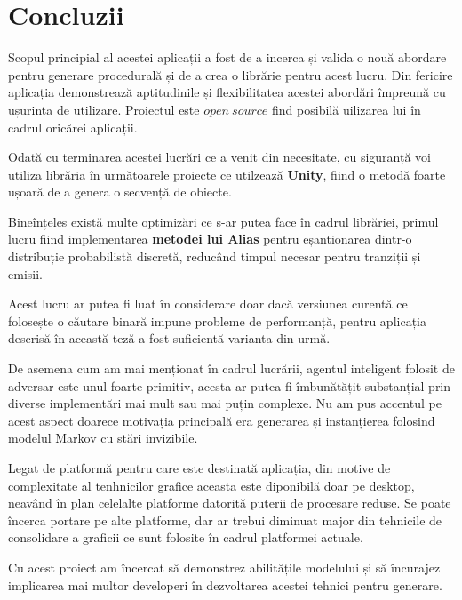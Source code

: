 \chapter*{Concluzii} 

Scopul principial al acestei aplicații a fost de a incerca și valida o nouă abordare pentru generare procedurală și de a crea o librărie pentru acest lucru. Din fericire aplicația demonstrează aptitudinile și flexibilitatea acestei abordări împreună cu ușurința de utilizare. Proiectul este $open \ source$ find posibilă uilizarea lui în cadrul oricărei aplicații.\par

Odată cu terminarea acestei lucrări ce a venit din necesitate, cu siguranță voi utiliza librăria în următoarele proiecte ce utilzează \textbf{Unity}, fiind o metodă foarte ușoară de a genera o secvență de obiecte.\par

Bineînțeles există multe optimizări ce s-ar putea face în cadrul librăriei, primul lucru fiind implementarea \textbf{metodei lui Alias} pentru eșantionarea dintr-o distribuție probabilistă discretă, reducând timpul necesar pentru tranziții și emisii.\par 

Acest lucru ar putea fi luat în considerare doar dacă versiunea curentă ce folosește o căutare binară impune probleme de performanță, pentru aplicația descrisă în această teză a fost suficientă varianta din urmă.\par

De asemena cum am mai menționat în cadrul lucrării, agentul inteligent folosit de adversar este unul foarte primitiv, acesta ar putea fi îmbunătățit substanțial prin diverse implementări mai mult sau mai puțin complexe. Nu am pus accentul pe acest aspect doarece motivația principală era generarea și instanțierea folosind modelul Markov cu stări invizibile.\par

Legat de platformă pentru care este destinată aplicația, din motive de complexitate al tenhnicilor grafice aceasta este diponibilă doar pe desktop, neavând în plan celelalte platforme datorită puterii de procesare reduse. Se poate încerca portare pe alte platforme, dar ar trebui diminuat major din tehnicile de consolidare a graficii ce sunt folosite în cadrul platformei actuale.\par

Cu acest proiect am încercat să demonstrez abilitățile modelului și să încurajez implicarea mai multor developeri în dezvoltarea acestei tehnici pentru generare.\par
